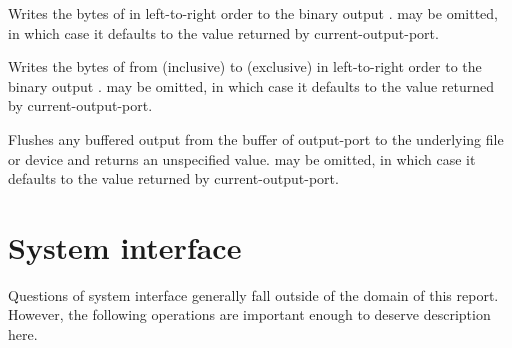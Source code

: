 \begin{entry}{%
}

Writes the bytes of  in left-to-right order to the
binary output .
 may be
omitted, in which case it defaults to the value returned by {\cf
  current-output-port}.

\end{entry}

\begin{entry}{%
}

Writes the bytes of 
from  (inclusive) to  (exclusive)
in left-to-right order to the
binary output .
 may be
omitted, in which case it defaults to the value returned by {\cf
  current-output-port}.

\end{entry}

\begin{entry}{%
}

Flushes any buffered output from the buffer of output-port to the
underlying file or device and returns an unspecified value.
 may be omitted, in which case it defaults to
the value returned by {\cf current-output-port}.

\end{entry}


\section{System interface}

Questions of system interface generally fall outside of the domain of this
report.  However, the following operations are important enough to
deserve description here.


